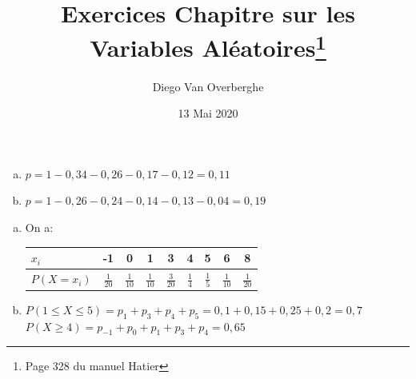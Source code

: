 \documentclass[12pt, a4paper]{article}
\begin{document}
    \title{Exercices Chapitre sur les Variables Aléatoires\footnote{Page 328 du manuel Hatier}}
    \author{Diego Van Overberghe}
    \date{13 Mai 2020}
    \maketitle
    
    \begin{Exercise}[number={33}]
        \begin{enumerate}[a)]
          \item $p=1-0{,}34-0{,}26-0{,}17-0{,}12=0{,}11$
          \item $p=1-0{,}26-0{,}24-0{,}14-0{,}13-0{,}04=0{,}19$
        \end{enumerate}
    \end{Exercise}

    \begin{Exercise}[number={35}]
      \begin{enumerate}[a)]
        \item On a: 
              \begin{center}\begin{tabular}{ | l || *{8}{c| } }
                \hline
                $x_i$                     & -1             & 0              & 1              & 3              & 4             & 5             & 6              & 8              \\ \hline
                $P(X=x_i)$ \hspace{0.5cm} & $\frac{1}{20}$ & $\frac{1}{10}$ & $\frac{1}{10}$ & $\frac{3}{20}$ & $\frac{1}{4}$ & $\frac{1}{5}$ & $\frac{1}{10}$ & $\frac{1}{20}$ \\ \hline
              \end{tabular}\end{center}
              \parbox{\linewidth}{}  
        \item $P(1\leq X\leq 5)=p_1+p_3+p_4+p_5=0{,}1+0{,}15+0{,}25+0{,}2=0{,}7$ \\ $P(X\geq 4)=p_{-1}+p_0+p_1+p_3+p_4=0{,}65$
      \end{enumerate}
    \end{Exercise}
\end{document}
